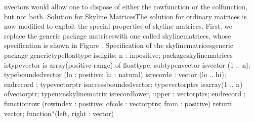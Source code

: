\tyxffmxmono[]n\Symuns[]vector\tyxffmxendmono[]s would allow one to
dispose of either the \tyxffmxmono[]row\tyxffmxendmono[] function
or the \tyxffmxmono[]col\tyxffmxendmono[] function, but not both.%
\Endpara[]
\DivEndiv[]
\HdMinLiv[]Solution for Skyline
Matrices\HdMinEndiv[]
\Para[]The solution for ordinary matrices is now modified to exploit
the special properties of skyline matrices. First, we replace the
generic package \tyxffmxmono[]matrices\tyxffmxendmono[] with one called
\tyxffmxmono[]skyline\Symuns[]matrices\tyxffmxendmono[], whose specification
is shown in Figure .
\Parbox[]
Specification of the
\tyxffmxmono[]skyline\Symuns[]matrices\tyxffmxendmono[] generic package%
\FgEndcap[]
\Comp[]\tyxtstxbf[]generic\tyxtstxendbf[]
   \tyxtstxbf[]type\tyxtstxendbf[] float\Symuns[]type %
\tyxtstxbf[]is\tyxtstxendbf[] \tyxtstxbf[]digits\tyxtstxendbf[] \Symlt[]\Symgt[];
   n : \tyxtstxbf[]in\tyxtstxendbf[] positive;
\tyxtstxbf[]package\tyxtstxendbf[] skyline\Symuns[]matrices %
\tyxtstxbf[]is\tyxtstxendbf[]
   \tyxtstxbf[]type\tyxtstxendbf[]    vector   \tyxtstxbf[]is%
\tyxtstxendbf[] \tyxtstxbf[]array\tyxtstxendbf[] (positive %
\tyxtstxbf[]range\tyxtstxendbf[] \Symlt[]\Symgt[]) \tyxtstxbf[]of%
\tyxtstxendbf[] float\Symuns[]type;
   \tyxtstxbf[]subtype\tyxtstxendbf[] n\Symuns[]vector %
\tyxtstxbf[]is\tyxtstxendbf[] vector (1 .. n);
   \tyxtstxbf[]type\tyxtstxendbf[] bounded\Symuns[]vector (lo : positive; hi : natural) %
\tyxtstxbf[]is\tyxtstxendbf[] \tyxtstxbf[]record\tyxtstxendbf[]
      e : vector (lo .. hi);
   \tyxtstxbf[]end\tyxtstxendbf[] \tyxtstxbf[]record%
\tyxtstxendbf[];
   \tyxtstxbf[]type\tyxtstxendbf[] vector\Symuns[]ptr         %
\tyxtstxbf[]is\tyxtstxendbf[] \tyxtstxbf[]access\tyxtstxendbf[] bounded\Symuns[]vector;
   \tyxtstxbf[]type\tyxtstxendbf[] vector\Symuns[]ptrs        %
\tyxtstxbf[]is\tyxtstxendbf[] \tyxtstxbf[]array\tyxtstxendbf[] (1 .. n) %
\tyxtstxbf[]of\tyxtstxendbf[] vector\Symuns[]ptr;
   \tyxtstxbf[]type\tyxtstxendbf[] nxn\Symuns[]skyline\Symuns[]matrix %
\tyxtstxbf[]is\tyxtstxendbf[] \tyxtstxbf[]record\tyxtstxendbf[]
      lower, upper : vector\Symuns[]ptrs;
   \tyxtstxbf[]end\tyxtstxendbf[] \tyxtstxbf[]record%
\tyxtstxendbf[];
   \tyxtstxbf[]function\tyxtstxendbf[] row (row\Symuns[]index : positive;
                 of\Symuns[]cols   : vector\Symuns[]ptrs;
                 from      : positive) \tyxtstxbf[]return%
\tyxtstxendbf[] vector;
   \tyxtstxbf[]function\tyxtstxendbf[] \quot[]*\quot[] (left, right : vector) %
